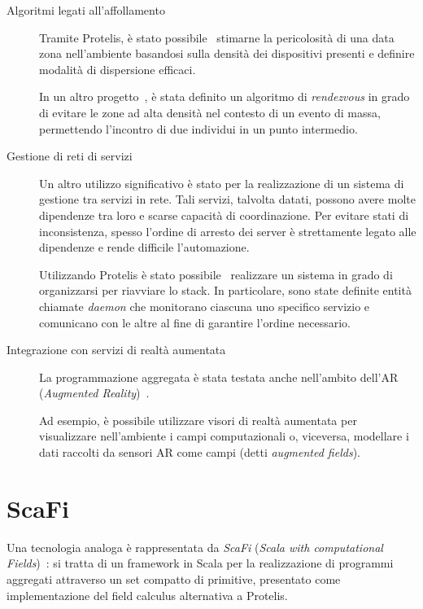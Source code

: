 \begin{description}
  \item[Algoritmi legati all'affollamento]
    Tramite Protelis, è stato possibile~\cite{7274429} stimarne la pericolosità di una data zona nell'ambiente basandosi sulla densità dei dispositivi presenti e definire modalità di dispersione efficaci.

    In un altro progetto~\cite{DBLP:journals/fgcs/CasadeiFPRSV19}, è stata definito un algoritmo di \emph{rendezvous} in grado di evitare le zone ad alta densità nel contesto di un evento di massa, permettendo l'incontro di due individui in un punto intermedio.

  \item[Gestione di reti di servizi]
    Un altro utilizzo significativo è stato per la realizzazione di un sistema di gestione tra servizi in rete.
    Tali servizi, talvolta datati, possono avere molte dipendenze tra loro e scarse capacità di coordinazione.
    Per evitare stati di inconsistenza, spesso l'ordine di arresto dei server è strettamente legato alle dipendenze e rende difficile l'automazione.

    Utilizzando Protelis è stato possibile~\cite{7306601} realizzare un sistema in grado di organizzarsi per riavviare lo stack.
    In particolare, sono state definite entità chiamate \emph{daemon} che monitorano ciascuna uno specifico servizio e comunicano con le altre al fine di garantire l'ordine necessario.

  \item[Integrazione con servizi di realtà aumentata]
    La programmazione aggregata è stata testata anche nell'ambito dell'AR (\emph{Augmented Reality})~\cite{PCRV-SCOPES2015}.

    Ad esempio, è possibile utilizzare visori di realtà aumentata per visualizzare nell'ambiente i campi computazionali
    o, viceversa, modellare i dati raccolti da sensori AR come campi (detti \emph{augmented fields}).
\end{description}

\section{ScaFi}\label{sec:scafi}

Una tecnologia analoga è rappresentata da \emph{ScaFi} (\emph{\emph{Sca}la with computational \emph{Fi}elds})~\cite{aggregatescala-pmldc2016}:
si tratta di un framework in Scala per la realizzazione di programmi aggregati attraverso un set compatto di primitive, presentato come implementazione del field calculus alternativa a Protelis.

